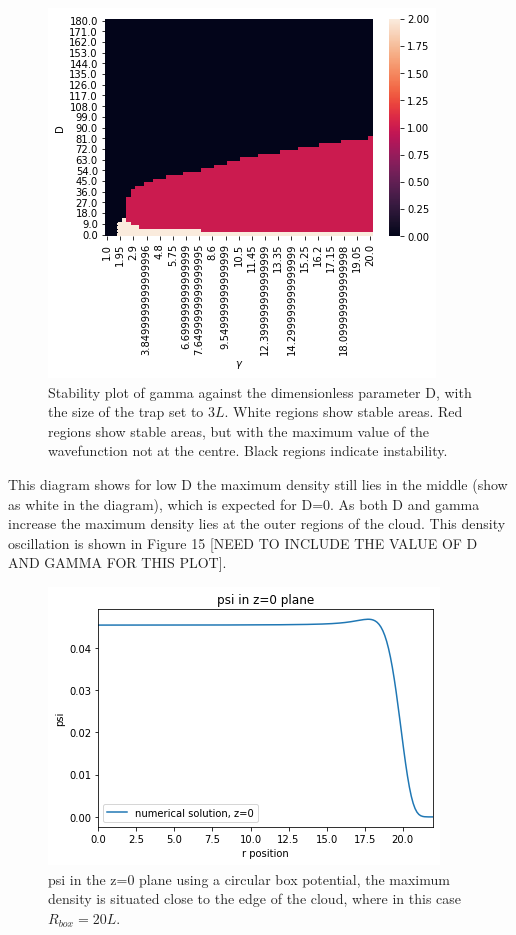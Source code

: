 \documentclass[10pt]{article}
\numberwithin{equation}{section}
\begin{document}
\begin{multicols}{2}
\begin{figure}[H]
\centering
\includegraphics[width=\linewidth]{box potential stability plot gamma = 10}
\caption{Stability plot of gamma against the dimensionless parameter D, with the size of the trap set to $3L$. White regions show stable areas. Red regions show stable areas, but with the maximum value of the wavefunction not at the centre. Black regions indicate instability.}
\end{figure}

This diagram shows for low D the maximum density still lies in the middle (show as white in the diagram), which is expected for D=0. As both D and gamma increase the maximum density lies at the outer regions of the cloud. This density oscillation is shown in Figure 15 [NEED TO INCLUDE THE VALUE OF D AND GAMMA FOR THIS PLOT]. 
\begin{figure}[H]
\centering
\includegraphics[width=\linewidth]{density oscillation}
\caption{psi in the z=0 plane using a circular box potential, the maximum density is situated close to the edge of the cloud, where in this case $R_{box}=20L$.}
\end{figure}


\end{multicols}
\end{document}
